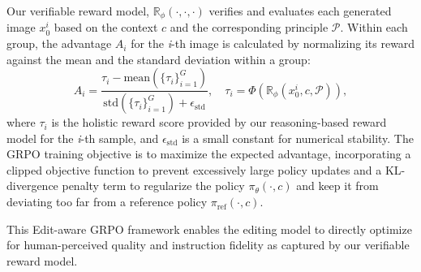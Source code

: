 Our verifiable reward model, $\mathbb{R}_\phi(\cdot,\cdot,\cdot)$ verifies and evaluates each generated image $x_0^i$ based on the context $c$ and the corresponding principle $\mathcal{P}$. 
Within each group, the advantage $A_i$ for the \textit{i}-th image is calculated by normalizing its reward against the mean and the standard deviation within a group:
\vspace{-0.5em}
\begin{equation}
A_i = \frac{\tau_i - \text{mean}\left(\{\tau_i\}_{i=1}^G\right)}{\text{std}\left(\{ \tau_i\}_{i=1}^G\right) + \epsilon_{\text{std}}},\quad \tau_i = \Phi\!\left(\mathbb{R}_\phi(x_0^i, c, \mathcal{P})\right),
\label{eq:advantage}
\end{equation}
where $\tau_i$ is the holistic reward score provided by our reasoning-based reward model for the \textit{i}-th sample, and $\epsilon_{\text{std}}$ is a small constant for numerical stability.
The GRPO training objective is to maximize the expected advantage, incorporating a clipped objective function to prevent excessively large policy updates and a KL-divergence penalty term to regularize the policy $\pi_\theta(\cdot,c)$ and keep it from deviating too far from a reference policy $\pi_{\text{ref}}(\cdot,c)$. 

This Edit-aware GRPO framework enables the editing model to directly optimize for human-perceived quality and instruction fidelity as captured by our verifiable reward model.
\vspace{1em}






